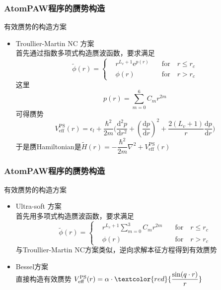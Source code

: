 \frame
{
	\frametitle{\textrm{AtomPAW}程序的赝势构造}
	有效赝势的构造方案
	\begin{itemize}
		\item \textrm{Troullier-Martin NC} 方案 \\
	首先通过指数多项式构造赝波函数，要求满足
	\begin{displaymath}
		\tilde\phi(r)=\left\{
			\begin{aligned}
				&r^{L_v+1}\mathrm{e}^{p(r)}\quad &\mathrm{for}\quad r\leqslant r_c \\
				&\phi(r)\quad &\mathrm{for}\quad r>r_c
			\end{aligned}
			\right.
	\end{displaymath}
	这里$$p(r)=\sum_{m=0}^6C_mr^{2m}$$
	可得赝势 
	$$V_{\mathrm{eff}}^{\mathrm{PS}}(r)=\epsilon_l+\dfrac{\hbar^2}{2m}\bigg(\dfrac{\mathrm{d}^2p}{\mathrm{d}r^2}+(\dfrac{\mathrm{d}p}{\mathrm{d}r})^2+\dfrac{2(L_v+1)}r\dfrac{\mathrm{d}p}{\mathrm{d}r}\bigg)$$
	于是赝\textrm{Hamiltonian}是$\tilde H(r)=-\dfrac{\hbar^2}{2m}\nabla^2+V_{\mathrm{eff}}^{\mathrm{PS}}(r)$
	\end{itemize}
}
\frame
{
	\frametitle{\textrm{AtomPAW}程序的赝势构造}
	有效赝势的构造方案
	\begin{itemize}
		\item \textrm{Ultra-soft} 方案 \\
	首先用多项式构造赝波函数，要求满足
	\begin{displaymath}
		\tilde\phi(r)=\left\{
			\begin{aligned}
				&r^{L_v+1}\sum_{m=0}^3C_mr^{2m}\quad &\mathrm{for}\quad r\leqslant r_c \\
				&\phi(r)\quad &\mathrm{for}\quad r>r_c
			\end{aligned}
			\right.
	\end{displaymath}
	与\textrm{Troullier-Martin NC}方案类似，逆向求解本征方程得到有效赝势
		\item \textrm{Bessel}方案\\
			直接构造有效赝势 $V_{\mathrm{eff}}^{\mathrm{PS}}(r)=\alpha\cdot\textcolor{red}{\dfrac{\sin(q\cdot r)}r}$
	\end{itemize}
}

